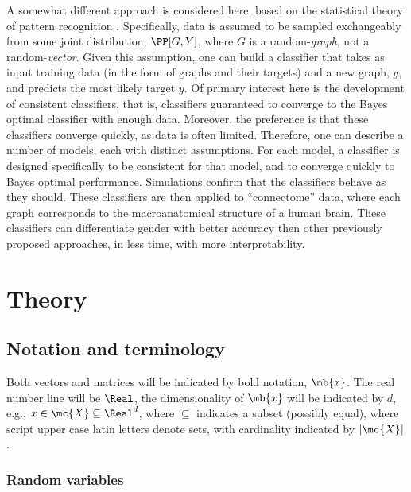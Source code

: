A somewhat different approach is considered here, based on the statistical theory of pattern recognition \cite{DGL96}.  Specifically, data is assumed to be sampled exchangeably from some joint distribution, $\PP[G,Y]$, where $G$ is a random-\emph{graph}, not a random-\emph{vector}.  Given this assumption, one can build a classifier that takes as input training data (in the form of graphs and their targets) and a new graph, $g$, and predicts the most likely target $y$.  Of primary interest here is the development of consistent classifiers, that is, classifiers guaranteed to converge to the Bayes optimal classifier with enough data.  Moreover, the preference is that these classifiers converge quickly, as data is often limited.  Therefore, one can describe a number of models, each with distinct assumptions.  For each model, a classifier is designed specifically to be consistent for that model, and to converge quickly to Bayes optimal performance.  Simulations confirm that the classifiers behave as they should.  These classifiers are then applied to ``connectome'' data, where each graph corresponds to the macroanatomical structure of a human brain.  These classifiers can differentiate gender with better accuracy then other previously proposed approaches, in less time, with more interpretability.


\section{Theory} %
\label{sec:theory}

\subsection{Notation and terminology} %
\label{sub:terminology_and_notation}

Both vectors and matrices will be indicated by bold notation, $\mb{x}$.  The real number line will be $\Real$, the dimensionality of $\mb{x}$ will be indicated by $d$, e.g., $x \in \mc{X} \subseteq \Real^{d}$, where $\subseteq$ indicates a subset (possibly equal), where script upper case latin letters denote sets, with cardinality indicated by $|\mc{X}|$. 


\subsubsection{Random variables} %
\label{ssub:subsubsection_name}


